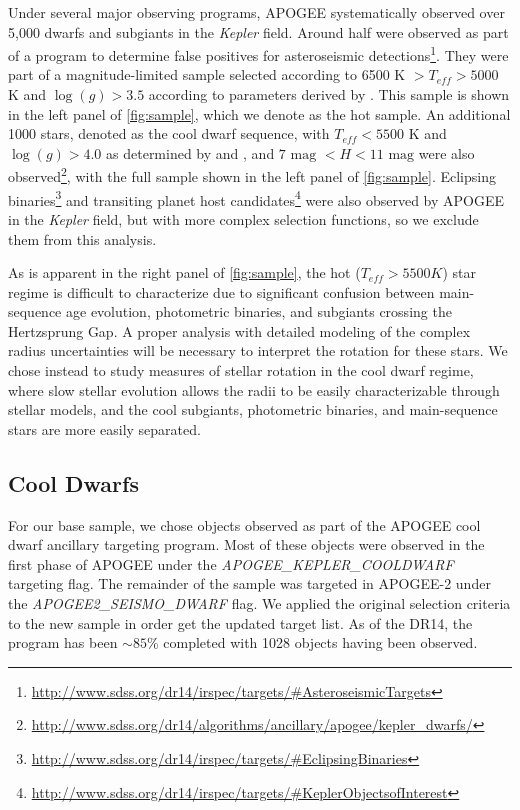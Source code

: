 \documentclass[manuscript]{aastex6}
\newcommand{\Kepler}{\mbox{\textit{Kepler}}}
\newcommand{\Teff}{\ensuremath{T_{eff}}}
\newcommand{\logg}{\ensuremath{\log(g)}}
\begin{document}
Under several major observing programs, APOGEE systematically observed over 
5,000 dwarfs and subgiants in the \Kepler{} field. Around half were
observed as part of a program to determine false positives for
asteroseismic
detections\footnote{\url{http://www.sdss.org/dr14/irspec/targets/\#AsteroseismicTargets}}. 
They were part of a magnitude-limited sample
selected according to 6500 K \(> \Teff > 5000\) K and \(\logg > 3.5\)
according to parameters derived by \citet{Huber14} \citep{Zasowski17}.
This sample is shown in the left panel of \cref{fig:sample}, which we denote as
the hot sample. An additional 
1000 stars, denoted as the cool dwarf sequence, with \(\Teff < 5500\) K and 
\(\logg > 4.0\) as determined by \citet{Pinsonneault12} and \citet{Brown11},
and \(7 \textrm{ mag } < H < 11 \textrm{ mag}\) were also 
observed\footnote{\url{http://www.sdss.org/dr14/algorithms/ancillary/apogee/kepler_dwarfs/}}, 
with the full sample shown in the left panel of \cref{fig:sample}. 
Eclipsing
binaries\footnote{\url{http://www.sdss.org/dr14/irspec/targets/\#EclipsingBinaries}} 
and transiting planet host 
candidates\footnote{\url{http://www.sdss.org/dr14/irspec/targets/\#KeplerObjectsofInterest}} 
were also observed 
by APOGEE in the \Kepler{} field, but with more complex selection functions, 
so we exclude them from this analysis.

As is apparent in the right panel of \cref{fig:sample}, the hot 
(\(\Teff > 5500 K\)) star regime is difficult to characterize due to 
significant confusion between main-sequence age evolution,
photometric binaries, and subgiants crossing the Hertzsprung Gap.
A proper analysis with detailed modeling of the complex radius uncertainties 
will be necessary to interpret the rotation for these stars. We chose instead to study measures of
stellar rotation in the cool dwarf regime, where
slow stellar evolution allows the radii to be easily characterizable through
stellar models, and the cool subgiants, photometric binaries, and main-sequence
stars are more easily separated.

\subsection{Cool Dwarfs}

For our base sample, we chose objects observed as part of the APOGEE cool
dwarf ancillary targeting program.  Most of these objects were observed in 
the first phase of APOGEE under the
\textit{APOGEE\_KEPLER\_COOLDWARF} targeting flag. The remainder of
the sample was targeted in APOGEE-2 under the \textit{APOGEE2\_SEISMO\_DWARF}
flag. We applied the original selection criteria to the new sample in order get
the updated target list. As of the DR14, the program has been \(\sim 85\)\% 
completed with 1028 objects having been observed. 
\end{document}
